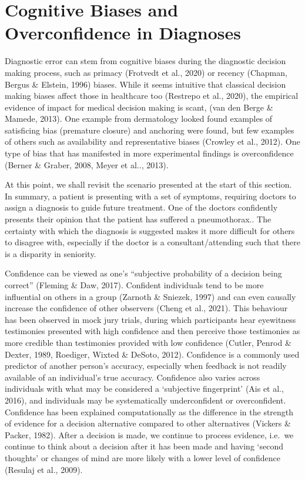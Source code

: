 \documentclass[a4paper, nobind]{templates/ociamthesis}
\begin{document}
\section*{Cognitive Biases and Overconfidence in Diagnoses}\label{cognitive-biases-and-overconfidence-in-diagnoses}

Diagnostic error can stem from cognitive biases during the diagnostic decision making process, such as primacy (Frotvedt et al., 2020) or recency (Chapman, Bergus \& Elstein, 1996) biases. While it seems intuitive that classical decision making biases affect those in healthcare too (Restrepo et al., 2020), the empirical evidence of impact for medical decision making is scant, (van den Berge \& Mamede, 2013). One example from dermatology looked found examples of satisficing bias (premature closure) and anchoring were found, but few examples of others such as availability and representative biases (Crowley et al., 2012). One type of bias that has manifested in more experimental findings is overconfidence (Berner \& Graber, 2008, Meyer et al.., 2013).

At this point, we shall revisit the scenario presented at the start of this section. In summary, a patient is presenting with a set of symptoms, requiring doctors to assign a diagnosis to guide future treatment. One of the doctors confidently presents their opinion that the patient has suffered a pneumothorax.. The certainty with which the diagnosis is suggested makes it more difficult for others to disagree with, especially if the doctor is a consultant/attending such that there is a disparity in seniority.

Confidence can be viewed as one's ``subjective probability of a decision being correct'' (Fleming \& Daw, 2017). Confident individuals tend to be more influential on others in a group (Zarnoth \& Sniezek, 1997) and can even causally increase the confidence of other observers (Cheng et al., 2021). This behaviour has been observed in mock jury trials, during which participants hear eyewitness testimonies presented with high confidence and then perceive those testimonies as more credible than testimonies provided with low confidence (Cutler, Penrod \& Dexter, 1989, Roediger, Wixted \& DeSoto, 2012). Confidence is a commonly used predictor of another person's accuracy, especially when feedback is not readily available of an individual's true accuracy. Confidence also varies across individuals with what may be considered a `subjective fingerprint' (Ais et al., 2016), and individuals may be systematically underconfident or overconfident. Confidence has been explained computationally as the difference in the strength of evidence for a decision alternative compared to other alternatives (Vickers \& Packer, 1982). After a decision is made, we continue to process evidence, i.e.~we continue to think about a decision after it has been made and having `second thoughts' or changes of mind are more likely with a lower level of confidence (Resulaj et al., 2009).
\end{document}
